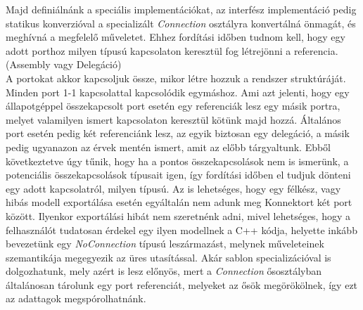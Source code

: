 \documentclass[a4paper,12pt]{report}
\begin{document}
Majd definiálnánk a speciális implementációkat, az interfész implementáció pedig statikus konverzióval a specializált \textit{Connection} osztályra konvertálná önmagát, és meghívná a megfelelő műveletet. Ehhez fordítási időben tudnom kell, hogy egy adott porthoz milyen típusú kapcsolaton keresztül fog létrejönni a referencia. (Assembly vagy Delegáció) \\ 
A portokat akkor kapcsoljuk össze, mikor létre hozzuk a rendszer struktúráját. Minden port 1-1 kapcsolattal kapcsolódik egymáshoz. Ami azt jelenti, hogy egy állapotgéppel összekapcsolt port esetén egy referenciák lesz egy másik portra, melyet valamilyen ismert kapcsolaton keresztül kötünk majd hozzá. Általános port esetén pedig két referenciánk lesz, az egyik biztosan egy delegáció, a másik pedig ugyanazon az érvek mentén ismert, amit az előbb tárgyaltunk. Ebből következtetve úgy tűnik, hogy ha a pontos összekapcsolások nem is ismerünk, a potenciális összekapcsolások típusait igen, így fordítási időben el tudjuk dönteni egy adott kapcsolatról, milyen típusú. Az is lehetséges, hogy egy félkész, vagy hibás modell exportálása esetén egyáltalán nem adunk meg Konnektort két port között. Ilyenkor exportálási hibát nem szeretnénk adni, mivel lehetséges, hogy a felhasználót tudatosan érdekel egy ilyen modellnek a C++ kódja, helyette inkább bevezetünk egy \textit{NoConnection} típusú leszármazást, melynek műveleteinek szemantikája megegyezik az üres utasítással. Akár sablon specializációval is dolgozhatunk, mely azért is lesz előnyös, mert a \textit{Connection} ősosztályban általánosan tárolunk egy port referenciát, melyeket az ősök megörökölnek, így ezt az adattagok megspórolhatnánk.
\end{document}
